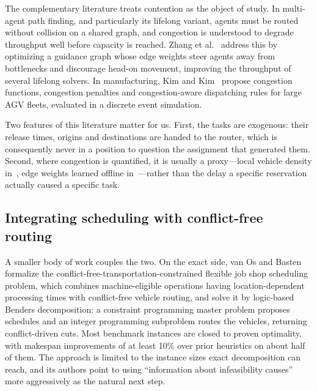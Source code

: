 \documentclass[manuscript,screen,review]{acmart}
\begin{document}
The complementary literature treats contention as the object of study. In
multi-agent path finding, and particularly its lifelong variant, agents must be
routed without collision on a shared graph, and congestion is understood to
degrade throughput well before capacity is reached. Zhang et
al.~\cite{zhang2024guidance} address this by optimizing a guidance graph whose
edge weights steer agents away from bottlenecks and discourage head-on movement,
improving the throughput of several lifelong solvers. In manufacturing, Kim and
Kim~\cite{kim2026congestion} propose congestion functions, congestion penalties
and congestion-aware dispatching rules for large AGV fleets, evaluated in a
discrete event simulation.

Two features of this literature matter for us. First, the tasks are exogenous:
their release times, origins and destinations are handed to the router, which is
consequently never in a position to question the assignment that generated them.
Second, where congestion is quantified, it is usually a proxy---local vehicle
density in~\cite{kim2026congestion}, edge weights learned offline
in~\cite{zhang2024guidance}---rather than the delay a specific reservation
actually caused a specific task.

\subsection{Integrating scheduling with conflict-free routing}

A smaller body of work couples the two. On the exact side, van Os and
Basten~\cite{vanos2026exact} formalize the
conflict-free-transportation-constrained flexible job shop scheduling problem,
which combines machine-eligible operations having location-dependent processing
times with conflict-free vehicle routing, and solve it by logic-based Benders
decomposition: a constraint programming master problem proposes schedules and an
integer programming subproblem routes the vehicles, returning conflict-driven
cuts. Most benchmark instances are closed to proven optimality, with makespan
improvements of at least 10\% over prior heuristics on about half of them. The
approach is limited to the instance sizes exact decomposition can reach, and its
authors point to using ``information about infeasibility causes'' more
aggressively as the natural next step.
\end{document}
